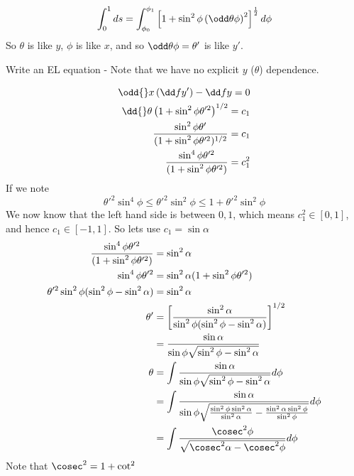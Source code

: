 \documentclass{X:/Documents/Coding/Latex/myassignment}
\begin{document}
\begin{align*}
	\int_0^1 ds &= \int_{\phi_0}^{\phi_1} \left[1 + \sin^2\phi \left(\odd \theta\phi\right)^2\right]^{\frac12} d\phi \\
\end{align*}
So $\theta$ is like $y$, $\phi$ is like $x$, and so $\odd \theta\phi = \theta'$ is like $y'$.

Write an EL equation - Note that we have no explicit $y$ ($\theta$) dependence.

\begin{align*}
	\odd{}x \left(\dd f{y'}\right) - \dd fy = 0\\
	\dd{}\theta \left(1 + \sin^2 \phi \theta'^2\right)^{1/2} = c_1\\
	\frac{\sin^2\phi \theta'}{(1+\sin^2\phi \theta'^2)^{1/2}} = c_1\\
	\frac{\sin^4\phi \theta'^2}{(1+\sin^2\phi \theta'^2)} = c_1^2\\
\end{align*}
If we note
\[\theta'^2 \sin^{4}\phi \leq \theta'^2 \sin^2\phi \leq 1 + \theta'^2 \sin^2\phi  \]
We now know that the left hand side is between $0,1$, which means $c_1^2 \in [0,1]$, and hence $c_1 \in [-1,1]$. So lets use $c_1 = \sin \alpha$
\begin{align*}
	\frac{\sin^4\phi \theta'^2}{(1+\sin^2\phi \theta'^2)}& = \sin^2 \alpha\\
	\sin^4\phi \theta'^2 &= \sin^2 \alpha (1+\sin^2\phi \theta'^2)\\
	\theta'^2 \sin^2\phi(\sin^2\phi - \sin^2 \alpha)& = \sin^2 \alpha\\
	\theta' &= \left[\frac{\sin^2 \alpha}{\sin^2\phi(\sin^2\phi - \sin^2 \alpha)}\right]^{1/2}\\
	&= \frac{\sin \alpha}{\sin \phi \sqrt{\sin^2\phi - \sin^2 \alpha}}\\
	\theta &= \int \frac{\sin \alpha}{\sin \phi \sqrt{\sin^2\phi - \sin^2 \alpha}} d\phi\\
	&= \int \frac{\sin \alpha}{\sin \phi \sqrt{\frac{\sin^2\phi\sin^2 \alpha}{\sin^2 \alpha} - \frac{\sin^2 \alpha \sin^2 \phi}{\sin^2 \phi}}} d\phi\\
	&= \int \frac{\cosec^2\phi}{\sqrt{\cosec^2 \alpha - \cosec^2 \phi}} d\phi
\end{align*}
Note that $\cosec^2 = 1+ \cot^2$
\end{document}
